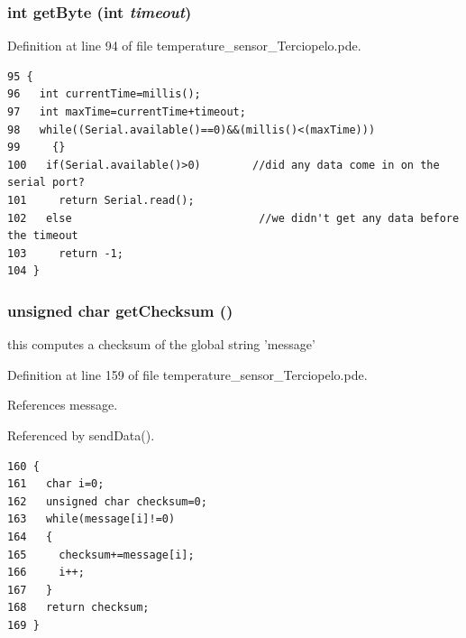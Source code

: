 \hypertarget{temperature__sensor___terciopelo_8pde_f8c68e93feeba5b9244094043672bac0}{
\subsubsection[{getByte}]{\setlength{\rightskip}{0pt plus 5cm}int getByte (int {\em timeout})}}
\label{temperature__sensor___terciopelo_8pde_f8c68e93feeba5b9244094043672bac0}




Definition at line 94 of file temperature\_\-sensor\_\-Terciopelo.pde.

\begin{Code}\begin{verbatim}95 {
96   int currentTime=millis();
97   int maxTime=currentTime+timeout;
98   while((Serial.available()==0)&&(millis()<(maxTime)))
99     {}
100   if(Serial.available()>0)        //did any data come in on the serial port?
101     return Serial.read();
102   else                             //we didn't get any data before the timeout
103     return -1;
104 }
\end{verbatim}
\end{Code}


\hypertarget{temperature__sensor___terciopelo_8pde_465a79dc430d1e52a5b540920da744ca}{
\subsubsection[{getChecksum}]{\setlength{\rightskip}{0pt plus 5cm}unsigned char getChecksum ()}}
\label{temperature__sensor___terciopelo_8pde_465a79dc430d1e52a5b540920da744ca}


this computes a checksum of the global string 'message' 



Definition at line 159 of file temperature\_\-sensor\_\-Terciopelo.pde.

References message.

Referenced by sendData().

\begin{Code}\begin{verbatim}160 {
161   char i=0;
162   unsigned char checksum=0;
163   while(message[i]!=0)
164   {
165     checksum+=message[i];
166     i++;
167   }
168   return checksum;
169 }
\end{verbatim}
\end{Code}


